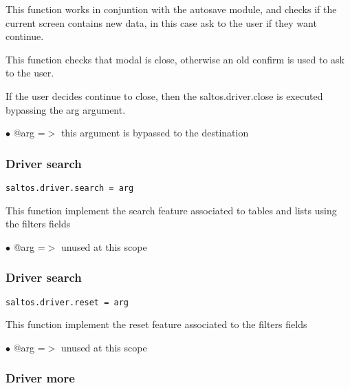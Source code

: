 \documentclass[a4paper]{article}
\begin{document}
This function works in conjuntion with the autosave module, and checks if the
current screen contains new data, in this case ask to the user if they want
continue.

This function checks that modal is close, otherwise an old confirm is used
to ask to the user.

If the user decides continue to close, then the saltos.driver.close is executed
bypassing the arg argument.

\begin{compactitem}
\item[\color{myblue}$\bullet$] @arg =$>$ this argument is bypassed to the destination
\end{compactitem}

\hypertarget{toc729}{}
\subsubsection{Driver search}

\begin{lstlisting}
saltos.driver.search = arg
\end{lstlisting}

This function implement the search feature associated to tables and lists
using the filters fields

\begin{compactitem}
\item[\color{myblue}$\bullet$] @arg =$>$ unused at this scope
\end{compactitem}

\hypertarget{toc730}{}
\subsubsection{Driver search}

\begin{lstlisting}
saltos.driver.reset = arg
\end{lstlisting}

This function implement the reset feature associated to the filters fields

\begin{compactitem}
\item[\color{myblue}$\bullet$] @arg =$>$ unused at this scope
\end{compactitem}

\hypertarget{toc731}{}
\subsubsection{Driver more}
\end{document}
